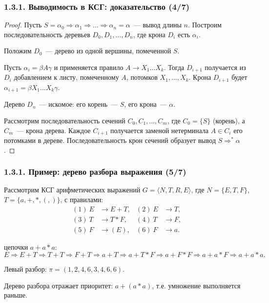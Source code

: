 \begin{frame}
\frametitle{1.3.1. Выводимость в КСГ: доказательство (4/7)}

\begin{proof}
Пусть $S = \alpha_0 \Rightarrow \alpha_1 \Rightarrow \ldots \Rightarrow \alpha_n = \alpha$~--- вывод длины $n$.
Построим последовательность деревьев $D_0, D_1, \ldots, D_n$, где крона $D_i$ есть $\alpha_i$.

Положим $D_0$~--- дерево из одной вершины, помеченной $S$.

Пусть $\alpha_i = \beta A \gamma$ и применяется правило $A \to X_1 \ldots X_k$.
Тогда $D_{i+1}$ получается из $D_i$ добавлением к листу, помеченному $A$, 
потомков $X_1, \ldots, X_k$.
Крона $D_{i+1}$ будет $\alpha_{i+1} = \beta X_1 \ldots X_k \gamma$.

Дерево $D_n$~--- искомое: его корень~--- $S$, его крона~--- $\alpha$.

Рассмотрим последовательность сечений $C_0, C_1, \ldots, C_m$, где $C_0 = \{S\}$ (корень), 
а $C_m$~--- крона дерева.
Каждое $C_{i+1}$ получается заменой нетерминала $A \in C_i$ его потомками в дереве.
Последовательность крон сечений образует вывод $S \Rightarrow^* \alpha$.
\end{proof}

\end{frame}



\begin{frame}
\frametitle{1.3.1. Пример: дерево разбора выражения (5/7)}

\begin{example}
Рассмотрим КСГ арифметических выражений 
$G = \langle N, T, R, E \rangle$, где $N = \{E, T, F\}$, $T = \{a, +, *, (, )\}$, с правилами:
\begin{align*}
(1)\ E &\to E + T, & (2)\ E &\to T, \\
(3)\ T &\to T * F, & (4)\ T &\to F, \\
(5)\ F &\to (E), & (6)\ F &\to a.
\end{align*}

 цепочки $a + a * a$:
\[
E \Rightarrow E + T \Rightarrow T + T \Rightarrow F + T \Rightarrow a + T \Rightarrow a + T * F \Rightarrow a + F * F \Rightarrow a + a * F \Rightarrow a + a * a.
\]

Левый разбор: $\pi = (1, 2, 4, 6, 3, 4, 6, 6)$.

Дерево разбора отражает приоритет: $a + (a * a)$, т.е. умножение выполняется раньше.
\end{example}

\end{frame}



